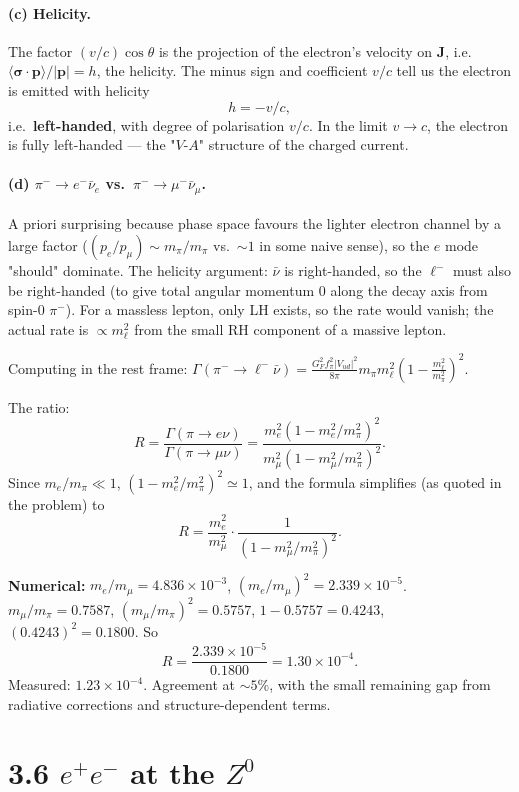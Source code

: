 \documentclass[11pt]{article}
\begin{document}
\paragraph{(c) Helicity.} The factor $(v/c)\cos\theta$ is the projection of the electron's velocity on $\mathbf{J}$, i.e.\ $\langle\boldsymbol{\sigma}\cdot\mathbf{p}\rangle/|\mathbf{p}|=h$, the helicity. The minus sign and coefficient $v/c$ tell us the electron is emitted with helicity
\[
h=-v/c,
\]
i.e.\ \textbf{left-handed}, with degree of polarisation $v/c$. In the limit $v\to c$, the electron is fully left-handed --- the "$V$-$A$" structure of the charged current.

\paragraph{(d) $\pi^-\to e^-\bar\nu_e$ vs.\ $\pi^-\to\mu^-\bar\nu_\mu$.}
A priori surprising because phase space favours the lighter electron channel by a large factor ($(p_e/p_\mu)\sim m_\pi/m_\pi$ vs.\ $\sim 1$ in some naive sense), so the $e$ mode "should" dominate. The helicity argument: $\bar\nu$ is right-handed, so the $\ell^-$ must also be right-handed (to give total angular momentum 0 along the decay axis from spin-0 $\pi^-$). For a massless lepton, only LH exists, so the rate would vanish; the actual rate is $\propto m_\ell^{2}$ from the small RH component of a massive lepton.

Computing in the rest frame: $\Gamma(\pi^-\to\ell^-\bar\nu)=\frac{G_F^{2}f_\pi^{2}|V_{ud}|^{2}}{8\pi}m_\pi m_\ell^{2}\!\left(1-\frac{m_\ell^{2}}{m_\pi^{2}}\right)^{2}$.

The ratio:
\[
R=\frac{\Gamma(\pi\to e\nu)}{\Gamma(\pi\to\mu\nu)}=\frac{m_e^{2}(1-m_e^{2}/m_\pi^{2})^{2}}{m_\mu^{2}(1-m_\mu^{2}/m_\pi^{2})^{2}}.
\]
Since $m_e/m_\pi\ll 1$, $(1-m_e^{2}/m_\pi^{2})^{2}\simeq 1$, and the formula simplifies (as quoted in the problem) to
\[
\boxed{\;R=\frac{m_e^{2}}{m_\mu^{2}}\cdot\frac{1}{(1-m_\mu^{2}/m_\pi^{2})^{2}}.\;}
\]

\textbf{Numerical:} $m_e/m_\mu=4.836\times 10^{-3}$, $(m_e/m_\mu)^{2}=2.339\times 10^{-5}$. $m_\mu/m_\pi=0.7587$, $(m_\mu/m_\pi)^{2}=0.5757$, $1-0.5757=0.4243$, $(0.4243)^{2}=0.1800$. So
\[
R=\frac{2.339\times 10^{-5}}{0.1800}=1.30\times 10^{-4}.
\]
Measured: $1.23\times 10^{-4}$. Agreement at $\sim 5\%$, with the small remaining gap from radiative corrections and structure-dependent terms.

\section*{3.6 \quad $e^+e^-$ at the $Z^0$}
\end{document}
